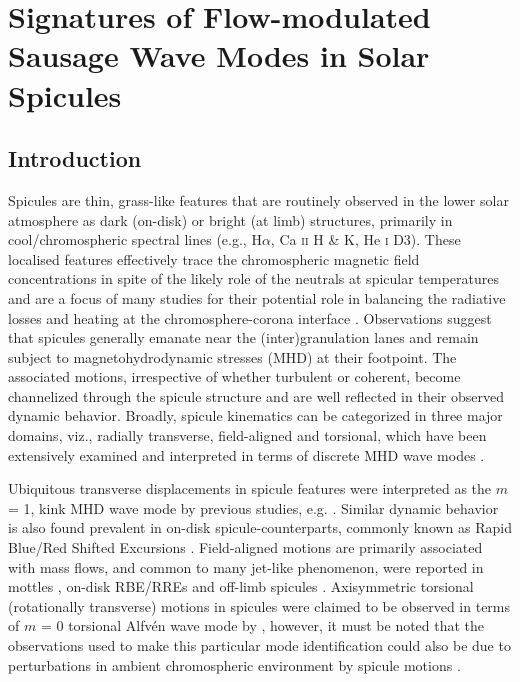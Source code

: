 \chapter{Signatures of Flow-modulated Sausage Wave Modes in Solar Spicules}
\section{Introduction}
Spicules are thin, grass-like features that are routinely observed in the lower solar atmosphere as dark (on-disk) or bright (at limb) structures, primarily in cool/chromospheric spectral lines (e.g., H$\alpha$, Ca \textsc{ii} H \& K, He \textsc{i} D3). These localised features effectively trace the chromospheric magnetic field concentrations in spite of the likely role of the neutrals at spicular temperatures and are a focus of many studies for their potential role in balancing the radiative losses and heating at the chromosphere-corona interface \citep{Tsiropoula2012}. Observations suggest that spicules generally emanate near the (inter)granulation lanes and remain subject to magnetohydrodynamic stresses (MHD) at their footpoint. The associated motions, irrespective of whether turbulent or coherent, become channelized through the spicule structure and are well reflected in their observed dynamic behavior. Broadly, spicule kinematics can be categorized in three major domains, viz., radially transverse, field-aligned and torsional, which have been extensively examined and interpreted in terms of discrete MHD wave modes \citep[see review:][]{Zaqarashvili2009}. 

Ubiquitous transverse displacements in spicule features were interpreted as the $m$ = 1, kink MHD wave mode by previous studies, e.g.  \citep{Kukhianidze2006, DePontieu2007, Ebadi2014, Sharma2017}.  Similar dynamic behavior is also found prevalent in on-disk spicule-counterparts, commonly known as Rapid Blue/Red Shifted Excursions \citep[RBE,RREs:][]{RouppevanderVoort2009}. Field-aligned motions are primarily associated with mass flows, and common to many jet-like phenomenon, were reported in mottles \citep{Loughhead1974}, on-disk RBE/RREs \citep{Sekse2013} and off-limb spicules \citep{Pereira2012}. Axisymmetric torsional (rotationally transverse) motions in spicules were claimed to be observed in terms of $m$ = 0 torsional Alfv\'en wave mode by \citet{DePontieu2012}, however, it must be noted that the observations used to make this particular mode identification could also be due to perturbations in ambient chromospheric environment by spicule motions \citep{Goossens2014, Sharma2017}. 

